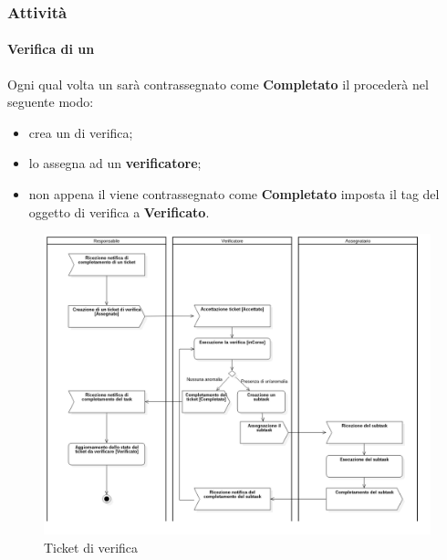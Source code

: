 \subsubsection{Attività}
\label{sec:3.2.1}
	\paragraph{Verifica di un }
	\label{sec:3.2.1.1}
		Ogni qual volta un  sarà contrassegnato come \textbf{Completato} il \RES {} procederà nel seguente modo: 
		\begin{itemize}
			\item crea un  di verifica;
			\item lo assegna ad un \textbf{verificatore};
			\item non appena il  viene contrassegnato come \textbf{Completato} imposta il tag del  oggetto di verifica a \textbf{Verificato}.
		\end{itemize}
		\begin{figure}
			\centering
			\includegraphics[scale=0.40]{img/ticketVerifica.png}
			\caption{Ticket di verifica}
		\end{figure}
